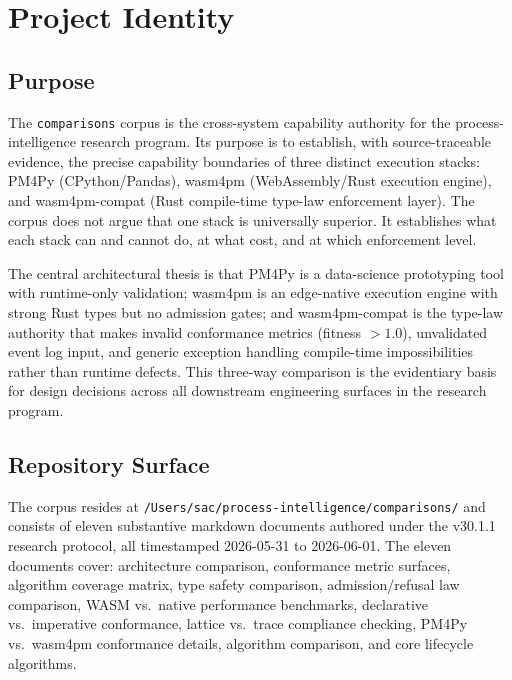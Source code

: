 
\section{Project Identity}
\label{sec:comparisons-identity}

\subsection{Purpose}
\label{sec:comparisons-identity-purpose}

The \texttt{comparisons} corpus is the cross-system capability authority for the
process-intelligence research program. Its purpose is to establish, with
source-traceable evidence, the precise capability boundaries of three distinct
execution stacks: PM4Py (CPython/Pandas), wasm4pm (WebAssembly/Rust execution
engine), and wasm4pm-compat (Rust compile-time type-law enforcement layer). The
corpus does not argue that one stack is universally superior. It establishes what
each stack can and cannot do, at what cost, and at which enforcement level.

The central architectural thesis is that PM4Py is a data-science prototyping
tool with runtime-only validation; wasm4pm is an edge-native execution engine with
strong Rust types but no admission gates; and wasm4pm-compat is the type-law
authority that makes invalid conformance metrics (fitness $> 1.0$), unvalidated
event log input, and generic exception handling compile-time impossibilities rather
than runtime defects. This three-way comparison is the evidentiary basis for
design decisions across all downstream engineering surfaces in the research
program.

\subsection{Repository Surface}
\label{sec:comparisons-identity-surface}

The corpus resides at \texttt{/Users/sac/process-intelligence/comparisons/} and
consists of eleven substantive markdown documents authored under the v30.1.1
research protocol, all timestamped 2026-05-31 to 2026-06-01. The eleven documents
cover: architecture comparison, conformance metric surfaces, algorithm coverage
matrix, type safety comparison, admission/refusal law comparison, WASM vs.\ native
performance benchmarks, declarative vs.\ imperative conformance, lattice vs.\ trace
compliance checking, PM4Py vs.\ wasm4pm conformance details, algorithm comparison,
and core lifecycle algorithms.

